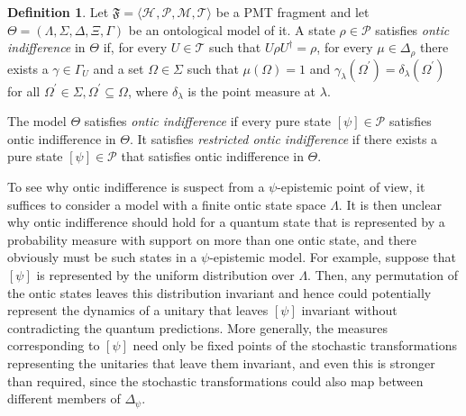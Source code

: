 \documentclass[DIV=calc,fontsize=12pt]{scrartcl} %
\theoremstyle{definition}
\newtheorem{definition}{Definition}[section]
\theoremstyle{plain}
\newcommand{\Proj}[1]{\ensuremath{\left [ #1 \right ]}}
\newcommand{\Hilb}[1][]{\ensuremath{\mathcal{H}_{#1}}}
\begin{document}
\begin{definition}
Let $\mathfrak{F} = \langle \Hilb, \mathcal{P}, \mathcal{M},
\mathcal{T} \rangle$ be a PMT fragment and let $\Theta = \left (
\Lambda, \Sigma, \Delta, \Xi, \Gamma \right )$ be an ontological
model of it.  A state $\rho \in \mathcal{P}$ satisfies \emph{ontic
indifference} in $\Theta$ if, for every $U \in \mathcal{T}$ such that
$U \rho U^{\dagger} = \rho$, for every $\mu \in \Delta_{\rho}$ there
exists a $\gamma \in \Gamma_U$ and a set $\Omega \in \Sigma$ such
that $\mu(\Omega) = 1$ and $\gamma_{\lambda}(\Omega^{\prime}) =
\delta_{\lambda}(\Omega^{\prime})$ for all $\Omega^{\prime} \in
\Sigma, \Omega^{\prime} \subseteq \Omega$, where $\delta_{\lambda}$
is the point measure at $\lambda$.

The model $\Theta$ satisfies \emph{ontic indifference} if every pure
state $\Proj{\psi} \in \mathcal{P}$ satisfies ontic indifference in
$\Theta$.  It satisfies \emph{restricted ontic indifference} if there
exists a pure state $\Proj{\psi} \in \mathcal{P}$ that satisfies
ontic indifference in $\Theta$.
\end{definition}

To see why ontic indifference is suspect from a $\psi$-epistemic point
of view, it suffices to consider a model with a finite ontic state
space $\Lambda$.  It is then unclear why ontic indifference should
hold for a quantum state that is represented by a probability measure
with support on more than one ontic state, and there obviously must be
such states in a $\psi$-epistemic model.  For example, suppose that
$\Proj{\psi}$ is represented by the uniform distribution over
$\Lambda$.  Then, any permutation of the ontic states leaves this
distribution invariant and hence could potentially represent the
dynamics of a unitary that leaves $\Proj{\psi}$ invariant without
contradicting the quantum predictions.  More generally, the measures
corresponding to $\Proj{\psi}$ need only be fixed points of the
stochastic transformations representing the unitaries that leave them
invariant, and even this is stronger than required, since the
stochastic transformations could also map between different members of
$\Delta_{\psi}$.
\end{document}
